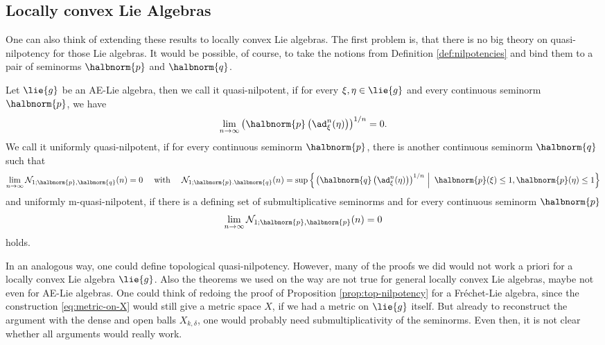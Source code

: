 \documentclass[
11pt,                          %
english                        %
]{article}
\begin{document}
\subsection{Locally convex Lie Algebras}
One can also think of extending these results to locally convex Lie algebras. The 
first problem is, that there is no big theory on quasi-nilpotency for those Lie 
algebras. It would be possible, of course, to take the notions from Definition 
\ref{def:nilpotencies} and bind them to a pair of seminorms $\halbnorm{p}$ and 
$\halbnorm{q}$.
\begin{definition}
	Let $\lie{g}$ be an AE-Lie algebra, then we call it quasi-nilpotent, if for 
	every $\xi, \eta \in \lie{g}$ and every continuous seminorm $\halbnorm{p}$,
	we have
	\begin{equation}
		\lim\limits_{n \rightarrow \infty}
		\left(
			\halbnorm{p}
			\left(
				\ad_\xi^n(\eta)
			\right)
		\right)^{1/n}
		=
		0.
	\end{equation}
	We call it uniformly quasi-nilpotent, if for every continuous seminorm 
	$\halbnorm{p}$, there is another continuous seminorm $\halbnorm{q}$ such that 
	\begin{equation}
		\lim\limits_{n \rightarrow \infty}
		\mathcal{N}_{1; \halbnorm{p}, \halbnorm{q}}(n)
		=
		0
		\quad \text{ with } \quad
		\mathcal{N}_{1; \halbnorm{p}. \halbnorm{q}}(n)
		=
		\sup
		\left\{
		\left.
			\left(
				\halbnorm{q}
				\left( \ad_\xi^n (\eta) \right)	
			\right)^{1/n}
		\ \right| \
			\halbnorm{p}(\xi) \leq 1,
			\halbnorm{p}(\eta) \leq 1
		\right\}
	\end{equation}
	and uniformly m-quasi-nilpotent, if there is a defining set of submultiplicative 
	seminorms and for every continuous seminorm 
	$\halbnorm{p}$
	\begin{equation}
		\lim\limits_{n \rightarrow \infty}
		\mathcal{N}_{1; \halbnorm{p}, \halbnorm{p}}(n)
		=
		0
	\end{equation}
	holds.
\end{definition}
In an analogous way, one could define topological quasi-nilpotency. However, many of 
the proofs we did would not work a priori for a locally convex Lie algebra 
$\lie{g}$. Also the theorems we used on the way are not true for general locally 
convex Lie algebras, maybe not even for AE-Lie algebras. One could think of redoing 
the proof of Proposition \ref{prop:top-nilpotency} for a Fr\'echet-Lie algebra, 
since the construction \eqref{eq:metric-on-X} would still give a metric space $X$, 
if we had a metric on $\lie{g}$ itself. But already to reconstruct the argument 
with the dense and open balls $X_{k, \delta}$, one would probably need 
submultiplicativity of the seminorms. Even then, it is not clear whether all 
arguments would really work.
\end{document}
